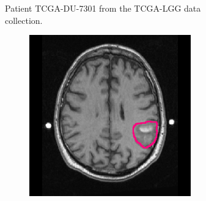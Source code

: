 \begin{subappendices}
\begin{figure}[htbp]
\begin{subfigure}[b]{0.95\textwidth}
\begin{subfigure}[b]{0.215\textwidth}
        \end{subfigure}
        \caption{Patient TCGA-DU-7301 from the TCGA-LGG data collection.}
    \end{subfigure}
    \begin{subfigure}[b]{0.95\textwidth}
        \centering
        \hfill
        \begin{subfigure}[b]{0.215\textwidth}
        \includegraphics[width=\textwidth, clip, trim=2.5cm 0.5cm 2.5cm 0.5cm]{Figures/Random_segs/T1_TCGA-FG-5964.png}
        \end{subfigure}
        \hfill
        \begin{subfigure}[b]{0.215\textwidth}

\end{subfigure}
\end{subfigure}
\end{figure}
\end{subappendices}
